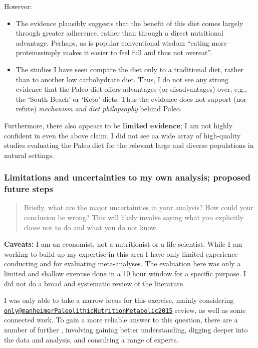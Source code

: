 \documentclass[]{article}
\begin{document}
However:

\begin{itemize}
\item
  The evidence plausibly suggests that the benefit of this diet comes
  largely through greater adherence, rather than through a direct
  nutritional advantage. Perhaps, as is popular conventional wisdom
  ``eating more proteinssimply makes it easier to feel full and thus not
  overeat''.
\item
  The studies I have seen compare the diet only to a traditional diet,
  rather than to another low carbohydrate diet. Thus, I do not see any
  strong evidence that the Paleo diet offers advantages (or
  disadvantages) over, e.g., the `South Beach' or `Keto' diets. Thus the
  evidence does not support (nor refute) \emph{mechanism and diet
  philopsophy} behind Paleo.\\
\end{itemize}

Furthermore, there also appears to be \textbf{limited evidence}; I am
not highly confident in even the above claim. I did not see aa wide
array of high-quality studies evaluating the Paleo diet for the relevant
large and diverse populations in natural settings.

\hypertarget{limitations-p}{%
\subsubsection{Limitations and uncertainties to my own analysis;
proposed future steps}\label{limitations-p}}

\begin{quote}
Briefly, what are the major uncertainties in your analysis? How could
your conclusion be wrong? This will likely involve saying what you
explicitly chose not to do and what you do not know.
\end{quote}

\textbf{Caveats:} I am an economist, not a nutritionist or a life
scientist. While I am working to build up my expertise in this area I
have only limited experience conducting and for evaluating
meta-analyses. The evaluation here was only a limited and shallow
exercise done in a 10 hour window for a specific purpose. I did not do a
broad and systematic review of the literature.

I was only able to take a narrow focus for this exercise, mainly
considering
\href{mailto:only@manheimerPaleolithicNutritionMetabolic2015}{\nolinkurl{only@manheimerPaleolithicNutritionMetabolic2015}}
review, as well as some connected work. To gain a more reliable answer
to this question, there are a number of further , involving gaining
better understanding, digging deeper into the data and analysis, and
consulting a range of experts.
\end{document}
